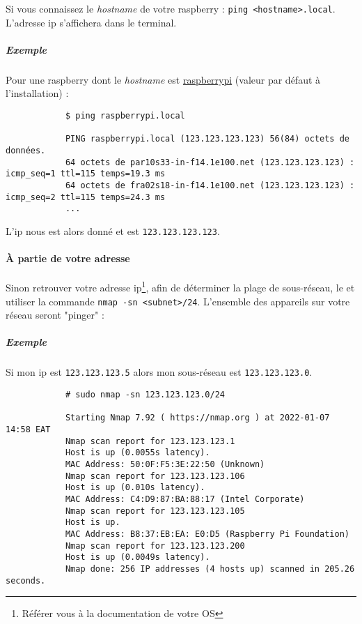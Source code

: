 Si vous connaissez le \textit{hostname} de votre \gls{raspberry} : \texttt{ping <hostname>.local}.\\
L'adresse \gls{ip} s'affichera dans le terminal.

\subparagraph{Exemple}

Pour une \gls{raspberry} dont le \textit{hostname} est \underline{raspberrypi} (valeur par défaut à
l'installation) :

\begin{verbatim}
            $ ping raspberrypi.local

            PING raspberrypi.local (123.123.123.123) 56(84) octets de données.
            64 octets de par10s33-in-f14.1e100.net (123.123.123.123) : icmp_seq=1 ttl=115 temps=19.3 ms
            64 octets de fra02s18-in-f14.1e100.net (123.123.123.123) : icmp_seq=2 ttl=115 temps=24.3 ms
            ...
\end{verbatim}

L'\gls{ip} nous est alors donné et est \texttt{123.123.123.123}.

\paragraph{À partie de votre adresse }

Sinon retrouver votre adresse \gls{ip}\footnote{Référer vous à la documentation de votre OS}, afin de déterminer
la plage de sous-réseau, le et utiliser la commande \texttt{nmap -sn <subnet>/24}.
L'ensemble des appareils sur votre réseau seront "pinger" :

\subparagraph{Exemple}

Si mon \gls{ip} est \texttt{123.123.123.5} alors mon sous-réseau est \texttt{123.123.123.0}.

\begin{verbatim}
            # sudo nmap -sn 123.123.123.0/24

            Starting Nmap 7.92 ( https://nmap.org ) at 2022-01-07 14:58 EAT
            Nmap scan report for 123.123.123.1
            Host is up (0.0055s latency).
            MAC Address: 50:0F:F5:3E:22:50 (Unknown)
            Nmap scan report for 123.123.123.106
            Host is up (0.010s latency).
            MAC Address: C4:D9:87:BA:88:17 (Intel Corporate)
            Nmap scan report for 123.123.123.105
            Host is up.
            MAC Address: B8:37:EB:EA: E0:D5 (Raspberry Pi Foundation)
            Nmap scan report for 123.123.123.200
            Host is up (0.0049s latency).
            Nmap done: 256 IP addresses (4 hosts up) scanned in 205.26 seconds.
\end{verbatim}

